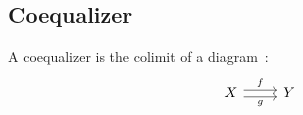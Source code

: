 \subsection{Coequalizer}

\begin{definition}[Coequalizer]

  A coequalizer is the colimit of a
  diagram~\parencite[p.~128]{leinster:basic_category_theory}:
  \[\begin{tikzcd}[ampersand replacement=\&]
    X \& Y
    \arrow["f", shift left=1, from=1-1, to=1-2]
    \arrow["g"', shift right=1, from=1-1, to=1-2]
  \end{tikzcd}\]
\end{definition}